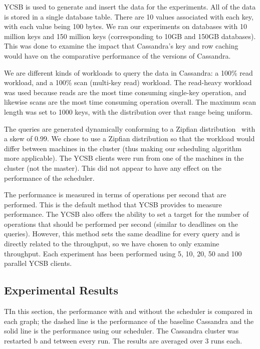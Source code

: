 \documentclass[]{acm_proc_article-sp}
\begin{document}
YCSB is used to generate and insert the data for the experiments. All of the data is stored in a single database table. There are 10 values associated with each key, with each value being 100 bytes. We ran our experiments on databases with 10 million keys and 150 million keys (corresponding to 10GB and 150GB databases). This was done to examine the impact that Cassandra’s key and row caching would have on the comparative performance of the versions of Cassandra.

We are different kinds of workloads to query the data in Cassandra: a 100\% read workload, and a 100\% scan (multi-key read) workload. The read-heavy workload was used because reads are the most time consuming single-key operation, and likewise scans are the most time consuming operation overall. The maximum scan length was set to 1000 keys, with the distribution over that range being uniform.

The queries are generated dynamically conforming to a Zipfian distribution~\cite{Quckly Generating Billion-Record Synthetic Databases} with a skew of 0.99. We chose to use a Zipfian distribution so that the workload would differ between machines in the cluster (thus making our scheduling algorithm more applicable). The YCSB clients were run from one of the machines in the cluster (not the master). This did not appear to have any effect on the performance of the scheduler. 

The performance is measured in terms of operations per second that are performed. This is the default method that YCSB provides to measure performance. The YCSB also offers the ability to set a target for the number of operations that should be performed per second (similar to deadlines on the queries). However, this method sets the same deadline for every query and is directly related to the throughput, so we have chosen to only examine throughput. Each experiment has been performed using 5, 10, 20, 50 and 100 parallel YCSB clients.

\subsection{Experimental Results}
TIn this section, the performance with and without the scheduler is compared in each graph; the dashed line is the performance of the baseline Cassandra and the solid line is the performance using our scheduler. The Cassandra cluster was restarted b and tetween every run. The results are averaged over 3 runs each.
\end{document}
